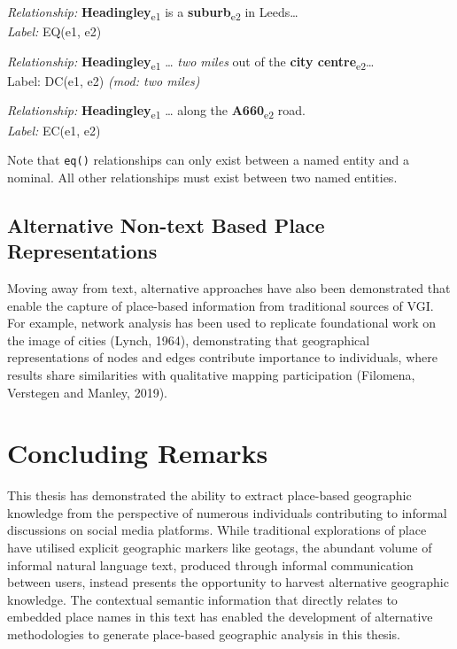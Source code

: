 \documentclass[
  letterpaper,
  11pt,
  english,
  onehalfspacing,
  headsepline]{MastersDoctoralThesis}
\begin{document}
\emph{Relationship:} \textbf{Headingley}\textsubscript{e1} is a
\textbf{suburb}\textsubscript{e2} in Leeds\ldots{}\\
\emph{Label:} EQ(e1, e2)

\emph{Relationship:} \textbf{Headingley}\textsubscript{e1} \ldots{}
\emph{two miles} out of the \textbf{city
centre}\textsubscript{e2}\ldots{}\\
Label: DC(e1, e2) \emph{(mod: two miles)}

\emph{Relationship:} \textbf{Headingley}\textsubscript{e1} \ldots{}
along the \textbf{A660}\textsubscript{e2} road.\\
\emph{Label:} EC(e1, e2)

Note that \texttt{eq()} relationships can only exist between a named
entity and a nominal. All other relationships must exist between two
named entities.

\hypertarget{alternative-non-text-based-place-representations}{%
\subsection{Alternative Non-text Based Place
Representations}\label{alternative-non-text-based-place-representations}}

Moving away from text, alternative approaches have also been
demonstrated that enable the capture of place-based information from
traditional sources of VGI. For example, network analysis has been used
to replicate foundational work on the image of cities (Lynch, 1964),
demonstrating that geographical representations of nodes and edges
contribute importance to individuals, where results share similarities
with qualitative mapping participation (Filomena, Verstegen and Manley,
2019).

\hypertarget{concluding-remarks}{%
\section{Concluding Remarks}\label{concluding-remarks}}

This thesis has demonstrated the ability to extract place-based
geographic knowledge from the perspective of numerous individuals
contributing to informal discussions on social media platforms. While
traditional explorations of place have utilised explicit geographic
markers like geotags, the abundant volume of informal natural language
text, produced through informal communication between users, instead
presents the opportunity to harvest alternative geographic knowledge.
The contextual semantic information that directly relates to embedded
place names in this text has enabled the development of alternative
methodologies to generate place-based geographic analysis in this
thesis.
\end{document}

